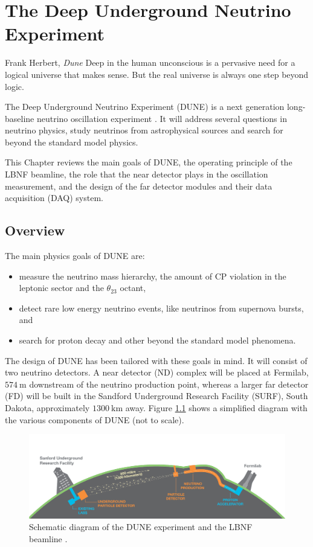 \chapter{The Deep Underground Neutrino Experiment}
\label{chapter:dune}

\begin{chapquote}{Frank Herbert, \textit{Dune}}
	Deep in the human unconscious is a pervasive need for a logical universe that makes sense. But the real universe is always one step beyond logic.
\end{chapquote}

The Deep Underground Neutrino Experiment (DUNE) is a next generation long-baseline neutrino oscillation experiment \cite{DUNE2020TDR1}. It will address several questions in neutrino physics, study neutrinos from astrophysical sources and search for beyond the standard model physics.

This Chapter reviews the main goals of DUNE, the operating principle of the LBNF beamline, the role that the near detector plays in the oscillation measurement, and the design of the far detector modules and their data acquisition (DAQ) system.

\section{Overview}

The main physics goals of DUNE are:
\begin{itemize}
	\item measure the neutrino mass hierarchy, the amount of CP violation in the leptonic sector and the $\theta_{23}$ octant,
	\item detect rare low energy neutrino events, like neutrinos from supernova bursts, and
	\item search for proton decay and other beyond the standard model phenomena.
\end{itemize}

The design of DUNE has been tailored with these goals in mind. It will consist of two neutrino detectors. A near detector (ND) complex will be placed at Fermilab, $574~\mathrm{m}$ downstream of the neutrino production point, whereas a larger far detector (FD) will be built in the Sandford Underground Research Facility (SURF), South Dakota, approximately $1300~\mathrm{km}$ away. Figure \ref{fig:dune} shows a simplified diagram with the various components of DUNE (not to scale).

\begin{figure}[t]
	\centering
	\includegraphics[width=0.9\linewidth]{Images/DUNE/FD/dune}
	\caption[Schematic diagram of the DUNE experiment and the LBNF beamline.]{Schematic diagram of the DUNE experiment and the LBNF beamline \cite{DUNE2020TDR1}.}
	\label{fig:dune}
\end{figure}

